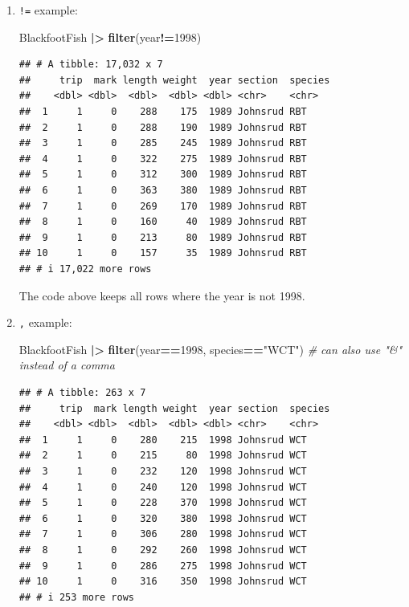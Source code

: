 \documentclass[
  10pt,
  letterpaper,
  twoside,
  openright]{book}
\newenvironment{Shaded}{\begin{snugshade}}{\end{snugshade}}
\newcommand{\CommentTok}[1]{\textcolor[rgb]{0.56,0.35,0.01}{\textit{#1}}}
\newcommand{\DecValTok}[1]{\textcolor[rgb]{0.00,0.00,0.81}{#1}}
\newcommand{\FunctionTok}[1]{\textcolor[rgb]{0.13,0.29,0.53}{\textbf{#1}}}
\newcommand{\NormalTok}[1]{#1}
\newcommand{\SpecialCharTok}[1]{\textcolor[rgb]{0.81,0.36,0.00}{\textbf{#1}}}
\newcommand{\StringTok}[1]{\textcolor[rgb]{0.31,0.60,0.02}{#1}}
\begin{document}
\begin{enumerate}
\def\labelenumi{\arabic{enumi}.}
\item
  \texttt{!=} example:

\begin{Shaded}
\begin{Highlighting}[]
\NormalTok{BlackfootFish }\SpecialCharTok{|\textgreater{}}
  \FunctionTok{filter}\NormalTok{(year}\SpecialCharTok{!=}\DecValTok{1998}\NormalTok{)}
\end{Highlighting}
\end{Shaded}

\begin{verbatim}
## # A tibble: 17,032 x 7
##     trip  mark length weight  year section  species
##    <dbl> <dbl>  <dbl>  <dbl> <dbl> <chr>    <chr>  
##  1     1     0    288    175  1989 Johnsrud RBT    
##  2     1     0    288    190  1989 Johnsrud RBT    
##  3     1     0    285    245  1989 Johnsrud RBT    
##  4     1     0    322    275  1989 Johnsrud RBT    
##  5     1     0    312    300  1989 Johnsrud RBT    
##  6     1     0    363    380  1989 Johnsrud RBT    
##  7     1     0    269    170  1989 Johnsrud RBT    
##  8     1     0    160     40  1989 Johnsrud RBT    
##  9     1     0    213     80  1989 Johnsrud RBT    
## 10     1     0    157     35  1989 Johnsrud RBT    
## # i 17,022 more rows
\end{verbatim}

  The code above keeps all rows where the year is not 1998.
\item
  \texttt{,} example:

\begin{Shaded}
\begin{Highlighting}[]
\NormalTok{BlackfootFish }\SpecialCharTok{|\textgreater{}}
  \FunctionTok{filter}\NormalTok{(year}\SpecialCharTok{==}\DecValTok{1998}\NormalTok{, species}\SpecialCharTok{==}\StringTok{"WCT"}\NormalTok{) }\CommentTok{\# can also use "\&" instead of a comma}
\end{Highlighting}
\end{Shaded}

\begin{verbatim}
## # A tibble: 263 x 7
##     trip  mark length weight  year section  species
##    <dbl> <dbl>  <dbl>  <dbl> <dbl> <chr>    <chr>  
##  1     1     0    280    215  1998 Johnsrud WCT    
##  2     1     0    215     80  1998 Johnsrud WCT    
##  3     1     0    232    120  1998 Johnsrud WCT    
##  4     1     0    240    120  1998 Johnsrud WCT    
##  5     1     0    228    370  1998 Johnsrud WCT    
##  6     1     0    320    380  1998 Johnsrud WCT    
##  7     1     0    306    280  1998 Johnsrud WCT    
##  8     1     0    292    260  1998 Johnsrud WCT    
##  9     1     0    286    275  1998 Johnsrud WCT    
## 10     1     0    316    350  1998 Johnsrud WCT    
## # i 253 more rows
\end{verbatim}


\end{enumerate}
\end{document}
